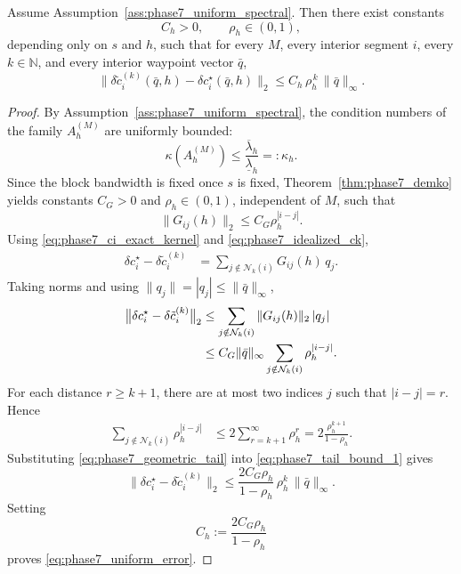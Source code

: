 \begin{theorem}
	\label{thm:phase7_uniform_error}
	Assume Assumption~\ref{ass:phase7_uniform_spectral}.
	Then there exist constants
	\[
	C_h>0,\qquad \rho_h\in(0,1),
	\]
	depending only on \(s\) and \(h\), such that for every \(M\), every interior segment \(i\), every \(k\in\mathbb N\), and every interior waypoint vector \(\bar q\),
	\begin{equation}
		\label{eq:phase7_uniform_error}
		\bigl\|
		\delta \tilde c_i^{(k)}(\bar q,h)-\delta c_i^\star(\bar q,h)
		\bigr\|_2
		\le
		C_h\,\rho_h^{\,k}\,\|\bar q\|_\infty .
	\end{equation}
\end{theorem}

\begin{proof}
	By Assumption~\ref{ass:phase7_uniform_spectral}, the condition numbers of the family \(A_h^{(M)}\) are uniformly bounded:
	\[
	\kappa(A_h^{(M)})\le \frac{\overline\lambda_h}{\underline\lambda_h}=: \kappa_h.
	\]
	Since the block bandwidth is fixed once \(s\) is fixed, Theorem~\ref{thm:phase7_demko} yields constants \(C_G>0\) and \(\rho_h\in(0,1)\), independent of \(M\), such that
	\[
	\|G_{ij}(h)\|_2\le C_G \rho_h^{|i-j|}.
	\]
	Using \eqref{eq:phase7_ci_exact_kernel} and \eqref{eq:phase7_idealized_ck},
	\begin{align}
		\delta c_i^\star-\delta \tilde c_i^{(k)}
		&=
		\sum_{j\notin\mathcal N_k(i)} G_{ij}(h)\,q_j.
		\label{eq:phase7_tail_start}
	\end{align}
	Taking norms and using \(\|q_j\|=|q_j|\le \|\bar q\|_\infty\),
	\begin{align}
		\bigl\|
		\delta c_i^\star-\delta \tilde c_i^{(k)}
		\bigr\|_2
		&\le
		\sum_{j\notin\mathcal N_k(i)}
		\|G_{ij}(h)\|_2\,|q_j|
		\notag\\
		&\le
		C_G\|\bar q\|_\infty
		\sum_{j\notin\mathcal N_k(i)}
		\rho_h^{|i-j|}.
		\label{eq:phase7_tail_bound_1}
	\end{align}
	For each distance \(r\ge k+1\), there are at most two indices \(j\) such that \(|i-j|=r\).
	Hence
	\begin{align}
		\sum_{j\notin\mathcal N_k(i)} \rho_h^{|i-j|}
		&\le
		2\sum_{r=k+1}^{\infty}\rho_h^{r}
		=
		2\frac{\rho_h^{k+1}}{1-\rho_h}.
		\label{eq:phase7_geometric_tail}
	\end{align}
	Substituting \eqref{eq:phase7_geometric_tail} into \eqref{eq:phase7_tail_bound_1} gives
	\[
	\bigl\|
	\delta c_i^\star-\delta \tilde c_i^{(k)}
	\bigr\|_2
	\le
	\frac{2C_G\rho_h}{1-\rho_h}\,\rho_h^k\,\|\bar q\|_\infty.
	\]
	Setting
	\[
	C_h:=\frac{2C_G\rho_h}{1-\rho_h}
	\]
	proves \eqref{eq:phase7_uniform_error}.
\end{proof}

